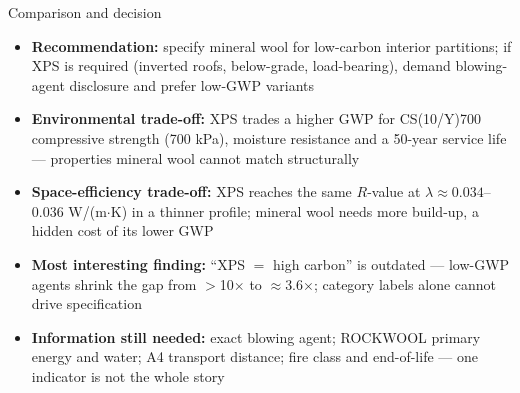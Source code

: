 \documentclass[11pt,aspectratio=43,ignorenonframetext,t]{beamer}
\begin{document}
\begin{frame}{Comparison and decision}
  \begin{itemize}
    \item \textbf{Recommendation:} specify mineral wool for low-carbon interior partitions; if XPS is required (inverted roofs, below-grade, load-bearing), demand blowing-agent disclosure and prefer low-GWP variants
    \item \textbf{Environmental trade-off:} XPS trades a higher GWP for CS(10/Y)700 compressive strength (700 kPa), moisture resistance and a 50-year service life --- properties mineral wool cannot match structurally
    \item \textbf{Space-efficiency trade-off:} XPS reaches the same $R$-value at $\lambda \approx 0.034$--0.036 W/(m$\cdot$K) in a thinner profile; mineral wool needs more build-up, a hidden cost of its lower GWP
    \item \textbf{Most interesting finding:} ``XPS $=$ high carbon'' is outdated --- low-GWP agents shrink the gap from $>$10$\times$ to $\approx$3.6$\times$; category labels alone cannot drive specification
    \item \textbf{Information still needed:} exact blowing agent; ROCKWOOL primary energy and water; A4 transport distance; fire class and end-of-life --- one indicator is not the whole story
  \end{itemize}

\end{frame}
\end{document}
